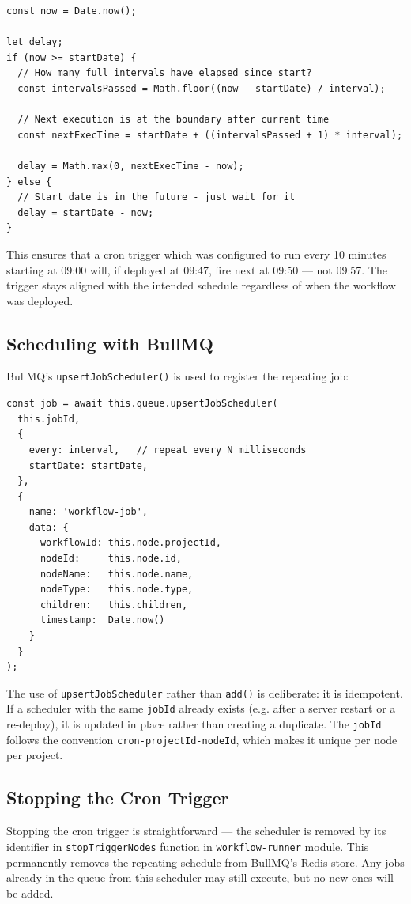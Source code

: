 \begin{lstlisting}
const now = Date.now();
 
let delay;
if (now >= startDate) {
  // How many full intervals have elapsed since start?
  const intervalsPassed = Math.floor((now - startDate) / interval);
 
  // Next execution is at the boundary after current time
  const nextExecTime = startDate + ((intervalsPassed + 1) * interval);
 
  delay = Math.max(0, nextExecTime - now);
} else {
  // Start date is in the future - just wait for it
  delay = startDate - now;
}
\end{lstlisting}

This ensures that a cron trigger which was configured to run every 10 minutes starting at 09:00 will, if deployed at 09:47, fire next at 09:50 — not 09:57. The trigger stays aligned with the intended schedule regardless of when the workflow was deployed.

\subsection{Scheduling with BullMQ}
BullMQ's \texttt{upsertJobScheduler()} is used to register the repeating job:

\begin{lstlisting}
const job = await this.queue.upsertJobScheduler(
  this.jobId,          
  {
    every: interval,   // repeat every N milliseconds
    startDate: startDate,
  },
  {
    name: 'workflow-job',
    data: {
      workflowId: this.node.projectId,
      nodeId:     this.node.id,
      nodeName:   this.node.name,
      nodeType:   this.node.type,
      children:   this.children,
      timestamp:  Date.now()
    }
  }
);
\end{lstlisting}

The use of \texttt{upsertJobScheduler} rather than \texttt{add()} is deliberate: it is idempotent. If a scheduler with the same \texttt{jobId} already exists (e.g. after a server restart or a re-deploy), it is updated in place rather than creating a duplicate. The \texttt{jobId} follows the convention \texttt{cron-{projectId}-{nodeId}}, which makes it unique per node per project.

\subsection{Stopping the Cron Trigger}
Stopping the cron trigger is straightforward — the scheduler is removed by its identifier in \texttt{stopTriggerNodes} function in \texttt{workflow-runner} module. This permanently removes the repeating schedule from BullMQ's Redis store. Any jobs already in the queue from this scheduler may still execute, but no new ones will be added.


